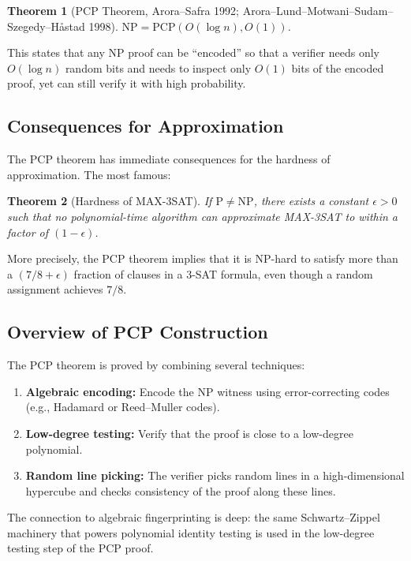 \documentclass[twoside,12pt]{book}
\theoremstyle{plain}
\newtheorem{theorem}{Theorem}[chapter]
\theoremstyle{definition}
\theoremstyle{remark}
\begin{document}
\begin{theorem}[PCP Theorem, Arora--Safra 1992; Arora--Lund--Motwani--Sudam--Szegedy--Håstad 1998]
$\mathrm{NP} = \mathrm{PCP}(O(\log n), O(1))$.
\end{theorem}

This states that any NP proof can be ``encoded'' so that a verifier needs only $O(\log n)$ random bits and needs to inspect only $O(1)$ bits of the encoded proof, yet can still verify it with high probability.

\subsection*{Consequences for Approximation}

The PCP theorem has immediate consequences for the hardness of approximation. The most famous:

\begin{theorem}[Hardness of MAX-3SAT]
If $\mathrm{P} \neq \mathrm{NP}$, there exists a constant $\epsilon > 0$ such that no polynomial-time algorithm can approximate MAX-3SAT to within a factor of $(1 - \epsilon)$.
\end{theorem}

More precisely, the PCP theorem implies that it is NP-hard to satisfy more than a $(7/8 + \epsilon)$ fraction of clauses in a 3-SAT formula, even though a random assignment achieves $7/8$.

\subsection*{Overview of PCP Construction}

The PCP theorem is proved by combining several techniques:
\begin{enumerate}
\item \textbf{Algebraic encoding:} Encode the NP witness using error-correcting codes (e.g., Hadamard or Reed--Muller codes).
\item \textbf{Low-degree testing:} Verify that the proof is close to a low-degree polynomial.
\item \textbf{Random line picking:} The verifier picks random lines in a high-dimensional hypercube and checks consistency of the proof along these lines.
\end{enumerate}

The connection to algebraic fingerprinting is deep: the same Schwartz--Zippel machinery that powers polynomial identity testing is used in the low-degree testing step of the PCP proof.
\end{document}
